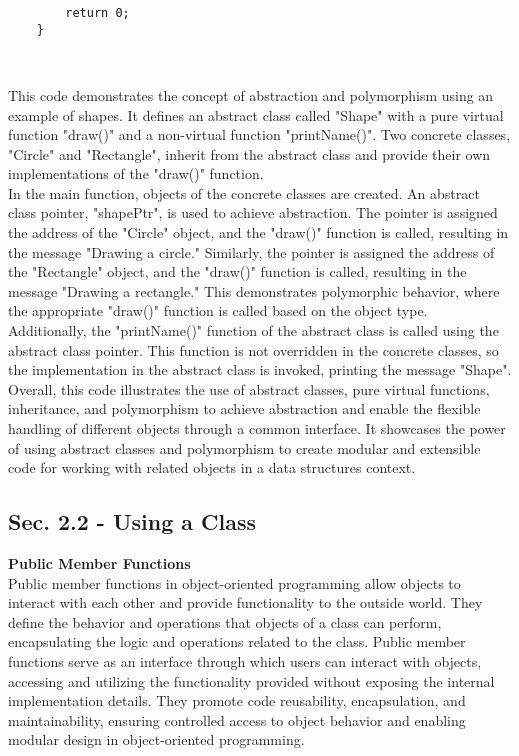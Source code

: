 \begin{solution}
\begin{verbatim}
        return 0;
    }
    \end{verbatim} \\
    \horizontalline

    This code demonstrates the concept of abstraction and polymorphism using an example of shapes. It defines an abstract class called "Shape" with a pure virtual function "draw()" and a non-virtual function "printName()". Two concrete classes, 
    "Circle" and "Rectangle", inherit from the abstract class and provide their own implementations of the "draw()" function. \\

    \noindent In the main function, objects of the concrete classes are created. An abstract class pointer, "shapePtr", is used to achieve abstraction. The pointer is assigned the address of the "Circle" object, and the "draw()" function is called, resulting
    in the message "Drawing a circle." Similarly, the pointer is assigned the address of the "Rectangle" object, and the "draw()" function is called, resulting in the message "Drawing a rectangle." This demonstrates polymorphic behavior, where the
    appropriate "draw()" function is called based on the object type. \\

    \noindent Additionally, the "printName()" function of the abstract class is called using the abstract class pointer. This function is not overridden in the concrete classes, so the implementation in the abstract class is invoked, printing the message 
    "Shape". \\

    \noindent Overall, this code illustrates the use of abstract classes, pure virtual functions, inheritance, and polymorphism to achieve abstraction and enable the flexible handling of different objects through a common interface. It showcases the power 
    of using abstract classes and polymorphism to create modular and extensible code for working with related objects in a data structures context. \\
\end{solution}

\subsection*{Sec. 2.2 - Using a Class}
\noindent \textbf{Public Member Functions} \\

Public member functions in object-oriented programming allow objects to interact with each other and provide functionality to the outside world. They define the behavior and operations that objects of a class can perform, encapsulating the logic and operations
related to the class. Public member functions serve as an interface through which users can interact with objects, accessing and utilizing the functionality provided without exposing the internal implementation details. They promote code reusability, encapsulation, 
and maintainability, ensuring controlled access to object behavior and enabling modular design in object-oriented programming. \\

